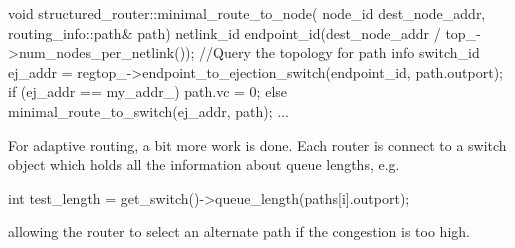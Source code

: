 \begin{CppCode}
void
structured_router::minimal_route_to_node(
  node_id dest_node_addr,
  routing_info::path& path)
{
  netlink_id endpoint_id(dest_node_addr / top_->num_nodes_per_netlink());
  //Query the topology for path info
  switch_id ej_addr = regtop_->endpoint_to_ejection_switch(endpoint_id, path.outport);
  if (ej_addr == my_addr_) {
    path.vc = 0;
  }
  else {
    minimal_route_to_switch(ej_addr, path);
  }
}
...
\end{CppCode}

For adaptive routing, a bit more work is done.
Each router is connect to a switch object which holds all the information about queue lengths, e.g.

\begin{CppCode}
int test_length = get_switch()->queue_length(paths[i].outport);
\end{CppCode}
allowing the router to select an alternate path if the congestion is too high. 


